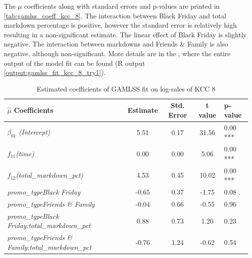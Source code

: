 The $\hat{\mu}$ coefficients along with standard errors and p-values are printed in \autoref{tab:gamlss_coeff_kcc_8}. The interaction between Black Friday and total markdown percentage is positive, however the standard error is relatively high resulting in a non-significant estimate. The linear effect of Black Friday is slightly negative. The interaction between markdowns and Friends \& Family is also negative, although non-significant. More details are in the , where the entire output of the model fit can be found (R output \ref{output:gamlss_fit_kcc_8_try1}).
\\


\begin{table}[H]
\centering
\begin{tabular}{l|c|c|c|l}
  \hline
  \rowcolor{white}
 \textbf{$\hat{\mu}$ Coefficients} & \textbf{Estimate} & \textbf{Std. Error} & \textbf{t value} & \textbf{p-value} \\ 
  \hline\hline
\textit{$\beta_{01}$ (Intercept)} & 5.51 & 0.17 & 31.56 & 0.00 *** \\ 
  \textit{$f_{11}$(time)} & 0.00 & 0.00 & 5.06 & 0.00 *** \\ 
  \textit{$f_{12}$(total\_markdown\_pct)} & 4.53 & 0.45 & 10.02 & 0.00 *** \\ 
  \textit{promo\_typeBlack Friday} & -0.65 & 0.37 & -1.75 & 0.08 . \\ 
  \textit{promo\_typeFriends \& Family} & -0.04 & 0.66 & -0.55 & 0.96 \\ 
  \textit{promo\_typeBlack Friday:total\_markdown\_pct} & 0.88 & 0.73 & 1.20 & 0.23  \\ 
  \textit{promo\_typeFriends \& Family:total\_markdown\_pct} & -0.76 & 1.24 & -0.62 & 0.54  \\ \hline
\end{tabular}
\caption{Estimated coefficients of \ac{GAMLSS} fit on log-sales of \ac{KCC} 8}
\label{tab:gamlss_coeff_kcc_8}
\end{table}




